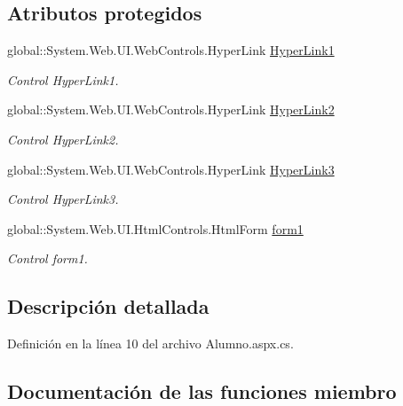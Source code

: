 \subsection*{Atributos protegidos}
\begin{DoxyCompactItemize}
\item 
global\+::\+System.\+Web.\+U\+I.\+Web\+Controls.\+Hyper\+Link \mbox{\hyperlink{classInicio_1_1Alumno_1_1WebForm1_a33b42d1a036679a4105a9139551089fd}{Hyper\+Link1}}
\begin{DoxyCompactList}\small\item\em Control Hyper\+Link1. \end{DoxyCompactList}\item 
global\+::\+System.\+Web.\+U\+I.\+Web\+Controls.\+Hyper\+Link \mbox{\hyperlink{classInicio_1_1Alumno_1_1WebForm1_a102ac909deb260558600a34e342f2bbc}{Hyper\+Link2}}
\begin{DoxyCompactList}\small\item\em Control Hyper\+Link2. \end{DoxyCompactList}\item 
global\+::\+System.\+Web.\+U\+I.\+Web\+Controls.\+Hyper\+Link \mbox{\hyperlink{classInicio_1_1Alumno_1_1WebForm1_a69cd82a51a5907999c095e1840c6ae50}{Hyper\+Link3}}
\begin{DoxyCompactList}\small\item\em Control Hyper\+Link3. \end{DoxyCompactList}\item 
global\+::\+System.\+Web.\+U\+I.\+Html\+Controls.\+Html\+Form \mbox{\hyperlink{classInicio_1_1Alumno_1_1WebForm1_a2137374d61434e8392c74d095f0516ba}{form1}}
\begin{DoxyCompactList}\small\item\em Control form1. \end{DoxyCompactList}\end{DoxyCompactItemize}


\subsection{Descripción detallada}


Definición en la línea 10 del archivo Alumno.\+aspx.\+cs.



\subsection{Documentación de las funciones miembro}
\mbox{\label{classInicio_1_1Alumno_1_1WebForm1_aacd2912ae3abebf6ba973a8596d4cc6f}} 
